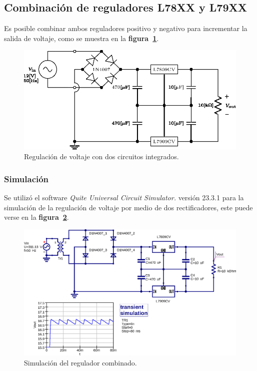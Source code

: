 \subsection{Combinación de reguladores L78XX y L79XX}
Es posible combinar ambos reguladores positivo y negativo para incrementar la
salida de voltaje, como se muestra en la \textbf{figura~\ref{circuito11}}.

\begin{figure}[!h]
\centering
\includegraphics[scale=1.1]{diagramas/11.regulador3.eps}
\caption{Regulación de voltaje con dos circuitos integrados.}
\label{circuito11}
\end{figure}

\subsubsection{Simulación}
Se utilizó el software \emph{Quite Universal Circuit Simulator.} versión 23.3.1
para la simulación de la regulación de voltaje por medio de dos rectificadores,
este puede verse en la \textbf{figura~\ref{simulacion11}}.

\begin{figure}[!h]
\centering
\includegraphics[scale=0.75]{simulacion/11.regulador3.eps}
\caption{Simulación del regulador combinado.}
\label{simulacion11}
\end{figure}

